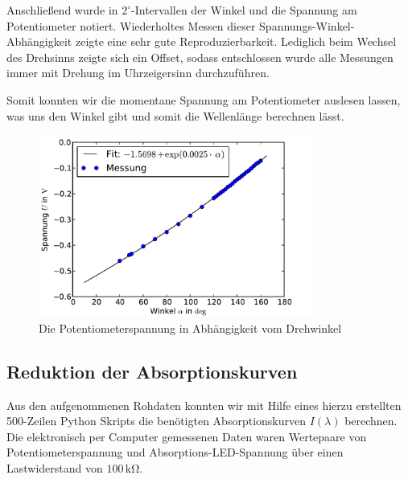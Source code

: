 \documentclass[11pt]{scrartcl}
\newcommand{\unit}[1]{\ensuremath{\,\mathrm{#1}}} %
\begin{document}
Anschließend wurde in $2^\circ$-Intervallen der Winkel und die Spannung am Potentiometer notiert. Wiederholtes Messen dieser Spannungs-Winkel-Abhängigkeit zeigte eine sehr gute Reproduzierbarkeit. Lediglich beim Wechsel des Drehsinns zeigte sich ein Offset, sodass entschlossen wurde alle Messungen immer mit Drehung im Uhrzeigersinn durchzuführen.

Somit konnten wir die momentane Spannung am Potentiometer auslesen lassen, was uns den Winkel gibt und somit die Wellenlänge berechnen lässt.

\begin{figure}[ht]
\begin{center}
\includegraphics[width=0.8\textwidth]{winkel_spannung.pdf}
\end{center}
\vspace{-1.5\baselineskip}
\caption{Die Potentiometerspannung in Abhängigkeit vom Drehwinkel}
\label{winkel_spannung}
\end{figure}


\FloatBarrier
\subsection{Reduktion der Absorptionskurven}
Aus den aufgenommenen Rohdaten konnten wir mit Hilfe eines hierzu erstellten 500-Zeilen Python Skripts die benötigten Absorptionskurven $I(\lambda)$ berechnen.
Die elektronisch per Computer gemessenen Daten waren Wertepaare von Potentiometerspannung und Absorptions-LED-Spannung über einen Lastwiderstand von $100\unit{k\Omega}$.
\end{document}
